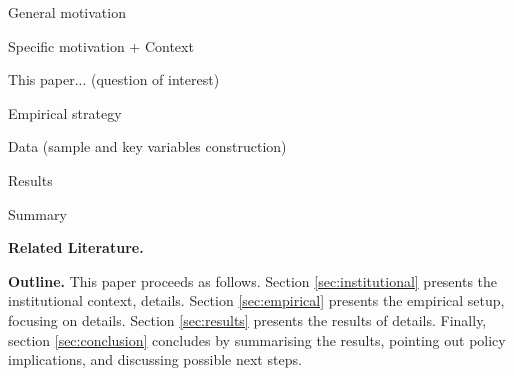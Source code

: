 General motivation

Specific motivation + Context

This paper... (question of interest)

Empirical strategy

Data (sample and key variables construction)

Results

Summary

\textbf{Related Literature.} 

\textbf{Outline.} This paper proceeds as follows. Section \ref{sec:institutional} presents the institutional context, details. Section \ref{sec:empirical} presents the empirical setup, focusing on details. Section \ref{sec:results} presents the results of details. Finally, section \ref{sec:conclusion} concludes by summarising the results, pointing out policy implications, and discussing possible next steps.
